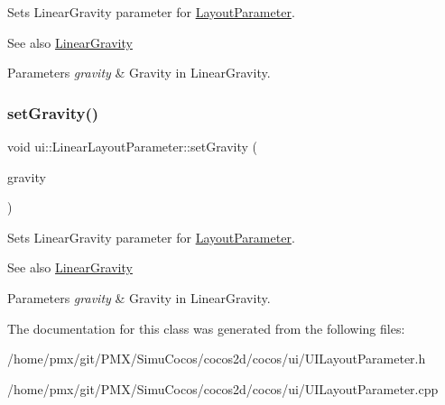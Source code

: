 Sets Linear\+Gravity parameter for \hyperlink{classui_1_1LayoutParameter}{Layout\+Parameter}.

\begin{DoxySeeAlso}{See also}
\hyperlink{classui_1_1LinearLayoutParameter_a2045fd6c06860357e95bccdf2531fe08}{Linear\+Gravity} 
\end{DoxySeeAlso}

\begin{DoxyParams}{Parameters}
{\em gravity} & Gravity in Linear\+Gravity. \\
\hline
\end{DoxyParams}
\mbox{\label{classui_1_1LinearLayoutParameter_a5ff8462b69c4e25041cef73621ddc963}} 
\subsubsection{\texorpdfstring{set\+Gravity()}{setGravity()}\hspace{0.1cm}{\footnotesize\ttfamily [2/2]}}
{\footnotesize\ttfamily void ui\+::\+Linear\+Layout\+Parameter\+::set\+Gravity (\begin{DoxyParamCaption}\item[{\hyperlink{classui_1_1LinearLayoutParameter_a2045fd6c06860357e95bccdf2531fe08}{Linear\+Gravity}}]{gravity }\end{DoxyParamCaption})}

Sets Linear\+Gravity parameter for \hyperlink{classui_1_1LayoutParameter}{Layout\+Parameter}.

\begin{DoxySeeAlso}{See also}
\hyperlink{classui_1_1LinearLayoutParameter_a2045fd6c06860357e95bccdf2531fe08}{Linear\+Gravity} 
\end{DoxySeeAlso}

\begin{DoxyParams}{Parameters}
{\em gravity} & Gravity in Linear\+Gravity. \\
\hline
\end{DoxyParams}


The documentation for this class was generated from the following files\+:\begin{DoxyCompactItemize}
\item 
/home/pmx/git/\+P\+M\+X/\+Simu\+Cocos/cocos2d/cocos/ui/U\+I\+Layout\+Parameter.\+h\item 
/home/pmx/git/\+P\+M\+X/\+Simu\+Cocos/cocos2d/cocos/ui/U\+I\+Layout\+Parameter.\+cpp\end{DoxyCompactItemize}
